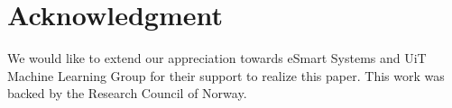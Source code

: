 \documentclass[journal]{IEEEtran}
\begin{document}
%



\section*{Acknowledgment}

We would like to extend our appreciation towards eSmart Systems and UiT Machine Learning Group for their support to realize this paper. This work was backed by the Research Council of Norway.


\ifCLASSOPTIONcaptionsoff
  \newpage
\fi






% 
{}
%
\end{document}
